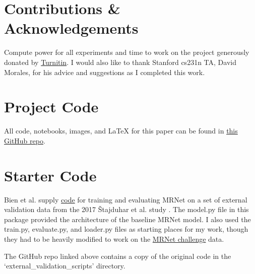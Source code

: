 \documentclass[10pt,twocolumn,letterpaper]{article}
\begin{document}
\appendix

\section{Contributions \& Acknowledgements}

Compute power for all experiments and time to work on the project generously donated by \href{https://www.turnitin.com/}{Turnitin}. I would also like to thank Stanford cs231n TA, David Morales, for his advice and suggestions as I completed this work.

\section{Project Code}

All code, notebooks, images, and LaTeX for this paper can be found in \href{https://github.com/FragLegs/mrnet}{this GitHub repo}.

\section{Starter Code}

Bien et al. supply \href{https://journals.plos.org/plosmedicine/article/file?type=supplementary&id=info:doi/10.1371/journal.pmed.1002699.s001}{code} for training and evaluating MRNet on a set of external
validation data from the 2017 Štajduhar et al. study \cite{vstajduhar2017semi}. The model.py file in this package provided the architecture of the baseline MRNet model. I also used the train.py, evaluate.py, and loader.py files as starting places for my work, though they had to be heavily modified to work on the \href{https://stanfordmlgroup.github.io/competitions/mrnet/}{MRNet challenge} data.

The GitHub repo linked above contains a copy of the original code in the `external\_validation\_scripts' directory.




\end{document}
